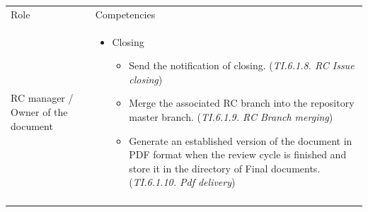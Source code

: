 \documentclass{template/openetcs_article}
\begin{document}
\begin{flushleft}
\begin{tabular}{|m{3cm}|m{11cm}|}
\hline
\rowcolor{myblue}
\multicolumn{2}{|c|}{Roles} \\\hline
\rowcolor{lightgray}
Role &
Competencies \\\hline
RC manager / Owner of the document &
\begin{itemize}
\item Closing
\begin{itemize}
\item Send the notification of closing. ({\it TI.6.1.8. RC Issue closing})
\item Merge the associated RC branch into the repository master branch. ({\it TI.6.1.9. RC Branch merging})
\item Generate an established version of the document in PDF format when the review cycle is finished and store it in the directory of Final documents. ({\it TI.6.1.10. Pdf delivery})
\end{itemize}
\end{itemize}
\\\\\hline
\end{tabular}
\end{flushleft}


\end{document}
